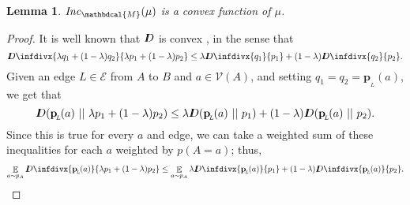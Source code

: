 \documentclass[letterpaper]{article} %
\theoremstyle{plain}
\newtheorem{lemma}[theorem]{Lemma}
\theoremstyle{definition}
\theoremstyle{remark}
\DeclareMathOperator*{\Ex}{\mathbb{E}} %
\newcommand\mat[1]{\mathbf{#1}}
\newcommand{\thickD}{I\mkern-8muD}
\newcommand{\kldiv}{\thickD\infdivx}
\newcommand{\bp}[1][L]{\mat{p}_{\!_{#1}\!}}
\newcommand{\Ed}{\mathcal E}
\newcommand{\dg}[1]{\mathbdcal{#1}}
\newcommand\Inc{\mathit{Inc}}
\begin{document}
\begin{lemma}
	\label{thm:inc-convex}
	$\Inc_{\dg M}( \mu)$ is a convex function of $\mu$.
\end{lemma}
\begin{proof}
    It is well known that $\thickD$ is convex \cite[Theorem
            2.7.2]{coverThomas}, in the sense that  
	\[ \kldiv{\lambda q_1 + (1-\lambda) q_2 }{ \lambda p_1
			  + (1-\lambda) p_2} \leq \lambda \kldiv {q_1}{ p_1} +
							(1-\lambda) \kldiv{q_2}{p_2}. \] 
Given an edge $L \in \Ed$ from $A$ to $B$ and $a \in \mathcal V(A)$,
and   
setting $q_1 = q_2 = \bp(a)$, we get that
	\[ \thickD(\bp(a) \ ||\ \lambda p_1 + (1-\lambda) p_2)
			\leq \lambda \thickD (\bp(a) \ ||\ p_1) + (1-\lambda)
							\thickD(\bp(a)\ ||\ p_2). \] 
	Since this is true for every $a$ and edge, we can take
		   a weighted sum of these inequalities for each $a$
		   weighted by $p(A=a)$; thus, 
	\begin{align*}
		\Ex_{a\sim p_A} \kldiv{\bp(a)}{\lambda p_1 +
			(1-\lambda) p_2} &\leq 
			 \Ex_{a\sim p_A}\lambda \kldiv {\bp(a)}{p_1} +
											(1-\lambda)
                         			 \kldiv{\bp(a)}{p_2}. \\

\end{align*}
\end{proof}
\end{document}
